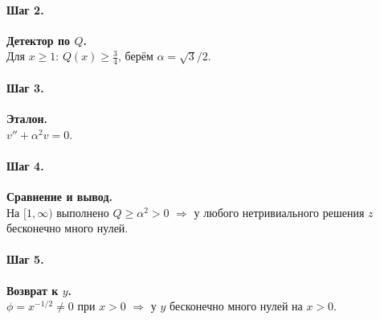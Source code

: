 \paragraph{Шаг 2.} \textbf{Детектор по \(Q\).}\\
Для \(x\ge 1\): \(Q(x)\ge \tfrac{3}{4}\), берём \(\alpha=\sqrt{3}/2\).

\paragraph{Шаг 3.} \textbf{Эталон.}\\
\(v''+\alpha^{2}v=0\).

\paragraph{Шаг 4.} \textbf{Сравнение и вывод.}\\
На \([1,\infty)\) выполнено \(Q\ge \alpha^{2}>0\) \(\Rightarrow\) у любого нетривиального решения \(z\) бесконечно много нулей.

\paragraph{Шаг 5.} \textbf{Возврат к \(y\).}\\
\(\phi=x^{-1/2}\neq 0\) при \(x>0\) \(\Rightarrow\) у \(y\) бесконечно много нулей на \(x>0\).
